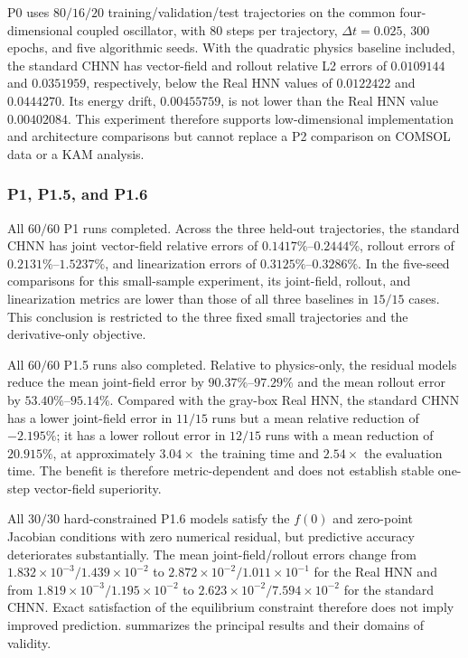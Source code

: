 P0 uses \(80/16/20\) training/validation/test trajectories on the common four-dimensional coupled oscillator, with 80 steps per trajectory, \(\Delta t=0.025\), 300 epochs, and five algorithmic seeds. With the quadratic physics baseline included, the standard CHNN has vector-field and rollout relative L2 errors of \(0.0109144\) and \(0.0351959\), respectively, below the Real HNN values of \(0.0122422\) and \(0.0444270\). Its energy drift, \(0.00455759\), is not lower than the Real HNN value \(0.00402084\). This experiment therefore supports low-dimensional implementation and architecture comparisons but cannot replace a P2 comparison on COMSOL data or a KAM analysis.



\subsubsection{P1, P1.5, and P1.6}\label{sec:numerical-6-3-p1}

All \(60/60\) P1 runs completed. Across the three held-out trajectories, the standard CHNN has joint vector-field relative errors of \(0.1417\%\)--\(0.2444\%\), rollout errors of \(0.2131\%\)--\(1.5237\%\), and linearization errors of \(0.3125\%\)--\(0.3286\%\). In the five-seed comparisons for this small-sample experiment, its joint-field, rollout, and linearization metrics are lower than those of all three baselines in \(15/15\) cases. This conclusion is restricted to the three fixed small trajectories and the derivative-only objective.

All \(60/60\) P1.5 runs also completed. Relative to physics-only, the residual models reduce the mean joint-field error by \(90.37\%\)--\(97.29\%\) and the mean rollout error by \(53.40\%\)--\(95.14\%\). Compared with the gray-box Real HNN, the standard CHNN has a lower joint-field error in \(11/15\) runs but a mean relative reduction of \(-2.195\%\); it has a lower rollout error in \(12/15\) runs with a mean reduction of \(20.915\%\), at approximately \(3.04\times\) the training time and \(2.54\times\) the evaluation time. The benefit is therefore metric-dependent and does not establish stable one-step vector-field superiority.

All \(30/30\) hard-constrained P1.6 models satisfy the \(f(0)\) and zero-point Jacobian conditions with zero numerical residual, but predictive accuracy deteriorates substantially. The mean joint-field/rollout errors change from \(1.832\times10^{-3}/1.439\times10^{-2}\) to \(2.872\times10^{-2}/1.011\times10^{-1}\) for the Real HNN and from \(1.819\times10^{-3}/1.195\times10^{-2}\) to \(2.623\times10^{-2}/7.594\times10^{-2}\) for the standard CHNN. Exact satisfaction of the equilibrium constraint therefore does not imply improved prediction.  summarizes the principal results and their domains of validity.

